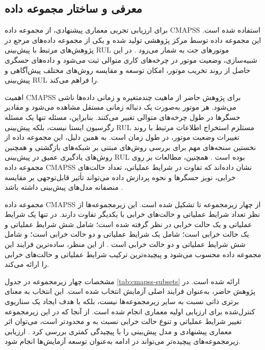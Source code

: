 \subsection{معرفی و ساختار مجموعه داده}
\label{sec:dataset-intro}

برای ارزیابی تجربی معماری پیشنهادی، از مجموعه داده
\gls{CMAPSS} استفاده شده است. این مجموعه داده توسط مرکز پژوهشی
تولید شده و یکی از مجموعه داده‌های مرجع در پژوهش‌های مرتبط با
پیش‌بینی \gls{RUL} موتورهای جت به شمار
می‌رود \cite{NASA2007C-MAPSS}.
در این شبیه‌سازی، وضعیت موتور در چرخه‌های کاری متوالی ثبت می‌شود و
داده‌های حسگری حاصل از روند تخریب موتور، امکان توسعه و مقایسه
روش‌های مختلف پیش‌آگاهی و پیش‌بینی \gls{RUL} را فراهم می‌کند.

اهمیت \gls{CMAPSS} برای پژوهش حاضر از ماهیت چندمتغیره و زمانی داده‌ها
ناشی می‌شود. هر موتور به‌صورت یک دنباله زمانی مستقل مشاهده می‌شود و
مقادیر حسگرها در طول چرخه‌های متوالی تغییر می‌کنند. بنابراین، مسئله
تنها یک مسئله رگرسیون ایستا نیست، بلکه پیش‌بینی \gls{RUL} مستلزم
استخراج اطلاعات مرتبط با روند تغییرات وضعیت موتور، در طول زمان است.
به همین دلیل، این مجموعه داده از نخستین سنجه‌های مهم برای بررسی
روش‌های مبتنی بر شبکه‌های بازگشتی و همچنین روش‌های یادگیری عمیق در
پیش‌بینی \gls{RUL} بوده است \cite{heimes2008recurrent}.
همچنین، مطالعات بر روی مجموعه داده CMAPSS نشان داده‌اند که
تفاوت در شرایط عملیاتی، تعداد حالت‌های خرابی، نویز حسگرها و نحوه
پردازش داده می‌تواند تأثیر قابل‌توجهی بر مقایسه منصفانه مدل‌های
پیش‌بینی داشته باشد \cite{NASA2007C-MAPSS}.

مجموعه داده \gls{CMAPSS} از چهار زیرمجموعه
 تا  تشکیل شده است. این زیرمجموعه‌ها از نظر
تعداد شرایط عملیاتی و حالت‌های خرابی با یکدیگر تفاوت دارند. در
 تنها یک شرایط عملیاتی و یک حالت خرابی در نظر گرفته شده
است؛  شامل شش شرایط عملیاتی و یک حالت خرابی است؛
 شامل یک شرایط عملیاتی و دو حالت خرابی است؛ و
 شامل شش شرایط عملیاتی و دو حالت خرابی است
\cite{NASA2007C-MAPSS}. از این منظر،
 ساده‌ترین فرایند این مجموعه داده محسوب می‌شود و
 پیچیده‌ترین ترکیب شرایط عملیاتی و حالت‌های خرابی را
ارائه می‌کند.

مشخصات چهار زیرمجموعه در جدول
\ref{tab:cmapss-subsets} ارائه شده است. در پژوهش حاضر، 
به‌عنوان فرایند اصلی آزمایش انتخاب شده است. این انتخاب به معنای
برتری ذاتی  نسبت به سایر زیرمجموعه‌ها نیست، بلکه با هدف
ایجاد یک سناریوی کنترل‌شده برای ارزیابی اولیه معماری انجام شده است.
از آنجا که در این زیرمجموعه تغییر شرایط عملیاتی و تنوع حالت خرابی
نسبت به  و  محدودتر است، می‌توان اثر معماری
پیشنهادی و مدل پیش‌بینی را با پیچیدگی کمتری بررسی کرد
\cite{NASA2007C-MAPSS}. ارزیابی زیرمجموعه‌های پیچیده‌تر می‌تواند
در ادامه به‌عنوان توسعه آزمایش‌ها انجام شود.

